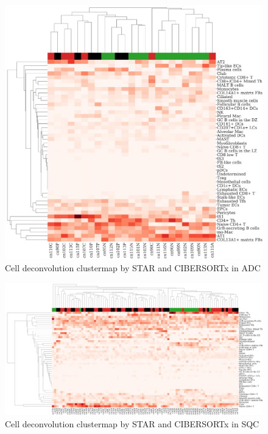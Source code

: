 \documentclass[a4paper]{article}
\begin{document}
                \begin{figure}[htbp]
                    \centering
                    \includegraphics[width=0.6 \linewidth]{figures/CIBERSORTx/clustermap/STAR.ADC.cluster.pdf}
                    \caption{Cell deconvolution clustermap by STAR and CIBERSORTx in ADC}
                    \label{fig:Deconvolution-CIBERSORTx-STAR-cluster-ADC}
                \end{figure}

                \begin{figure}[htbp]
                    \centering
                    \includegraphics[width=\linewidth]{figures/CIBERSORTx/clustermap/STAR.SQC.cluster.pdf}
                    \caption{Cell deconvolution clustermap by STAR and CIBERSORTx in SQC}
                    \label{fig:Deconvolution-CIBERSORTx-STAR-cluster-SQC}
                \end{figure}
\end{document}
